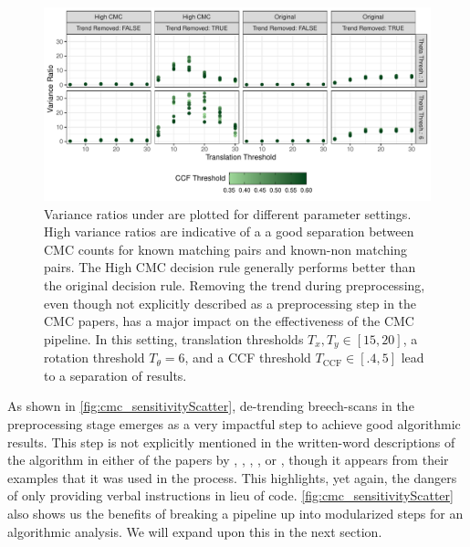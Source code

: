 \begin{Schunk}
\begin{figure}[htbp]

\includegraphics[width=\textwidth]{figures/cmcr-unnamed-chunk-20-1} \hfill{}

\caption{\label{fig:cmc_sensitivityScatter} Variance ratios under are plotted for different parameter settings. High variance ratios are indicative of a a good separation between CMC counts for known matching pairs and known-non matching pairs. The High CMC decision rule generally performs better than the original decision rule. Removing the trend during preprocessing, even though not explicitly described as a preprocessing step in the CMC papers, has a major impact on the effectiveness of the CMC pipeline. In this setting, translation thresholds $T_x, T_y \in [15,20]$, a rotation threshold $T_\theta = 6$, and a CCF threshold $T_{\text{CCF}} \in [.4,5]$ lead to a separation of results. }\label{fig:unnamed-chunk-20}
\end{figure}
\end{Schunk}

As shown in \autoref{fig:cmc_sensitivityScatter}, de-trending
breech-scans in the preprocessing stage emerges as a very impactful step
to achieve good algorithmic results. This step is not explicitly
mentioned in the written-word descriptions of the algorithm in either of
the papers by \citet{song_proposed_2013}, \citet{tong_fired_2014},
\citet{tong_improved_2015}, \citet{chen_convergence_2017}, or
\citet{song_estimating_2018}, though it appears from their examples that
it was used in the process. This highlights, yet again, the dangers of
only providing verbal instructions in lieu of code.
\autoref{fig:cmc_sensitivityScatter} also shows us the benefits of
breaking a pipeline up into modularized steps for an algorithmic
analysis. We will expand upon this in the next section.

